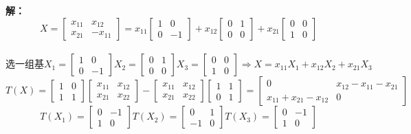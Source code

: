 \documentclass{article}
\begin{document}
\textbf{解：}
\[
X = \begin{bmatrix} x_{11} & x_{12} \\ x_{21} & -x_{11} \end{bmatrix} = 
x_{11}\begin{bmatrix}1 & 0 \\ 0 & -1\end{bmatrix} + 
x_{12}\begin{bmatrix}0 & 1 \\ 0 & 0\end{bmatrix} + 
x_{21}\begin{bmatrix}0 & 0 \\ 1 & 0\end{bmatrix}\] \\
\[
\text{选一组基}X_1 = \begin{bmatrix}1 & 0 \\ 0 & -1\end{bmatrix}
X_2 = \begin{bmatrix}0 & 1 \\ 0 & 0\end{bmatrix}
X_3 = \begin{bmatrix}0 & 0 \\ 1 & 0\end{bmatrix}
\Rightarrow X = x_{11}X_1 + x_{12}X_2 + x_{21}X_3
\]
\[
T(X)=\begin{bmatrix}1 & 0 \\ 1 & 1\end{bmatrix}
\begin{bmatrix}x_{11} & x_{12} \\ x_{21} & x_{22}\end{bmatrix} - 
\begin{bmatrix}x_{11} & x_{12} \\ x_{21} & x_{22}\end{bmatrix}
\begin{bmatrix}1 & 1 \\ 0 & 1\end{bmatrix} =
\begin{bmatrix}0 & x_{12}-x_{11}-x_{21} \\ x_{11}+x_{21}-x_{12} & 0\end{bmatrix}
\]
\[
T(X_1) = \begin{bmatrix}0 & -1 \\ 1 &0\end{bmatrix}
T(X_2) = \begin{bmatrix}0 & 1 \\ -1 &0\end{bmatrix}
T(X_3) = \begin{bmatrix}0 & -1 \\ 1 &0\end{bmatrix}
\]
\end{document}
